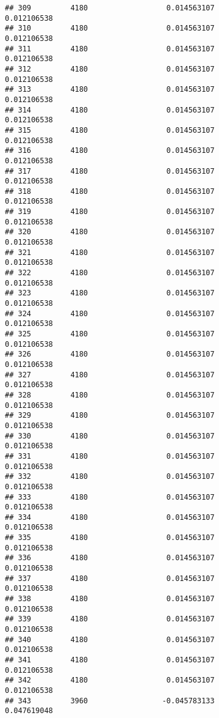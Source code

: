 \documentclass[]{article}
\begin{document}
\begin{verbatim}
## 309         4180                  0.014563107                0.012106538
## 310         4180                  0.014563107                0.012106538
## 311         4180                  0.014563107                0.012106538
## 312         4180                  0.014563107                0.012106538
## 313         4180                  0.014563107                0.012106538
## 314         4180                  0.014563107                0.012106538
## 315         4180                  0.014563107                0.012106538
## 316         4180                  0.014563107                0.012106538
## 317         4180                  0.014563107                0.012106538
## 318         4180                  0.014563107                0.012106538
## 319         4180                  0.014563107                0.012106538
## 320         4180                  0.014563107                0.012106538
## 321         4180                  0.014563107                0.012106538
## 322         4180                  0.014563107                0.012106538
## 323         4180                  0.014563107                0.012106538
## 324         4180                  0.014563107                0.012106538
## 325         4180                  0.014563107                0.012106538
## 326         4180                  0.014563107                0.012106538
## 327         4180                  0.014563107                0.012106538
## 328         4180                  0.014563107                0.012106538
## 329         4180                  0.014563107                0.012106538
## 330         4180                  0.014563107                0.012106538
## 331         4180                  0.014563107                0.012106538
## 332         4180                  0.014563107                0.012106538
## 333         4180                  0.014563107                0.012106538
## 334         4180                  0.014563107                0.012106538
## 335         4180                  0.014563107                0.012106538
## 336         4180                  0.014563107                0.012106538
## 337         4180                  0.014563107                0.012106538
## 338         4180                  0.014563107                0.012106538
## 339         4180                  0.014563107                0.012106538
## 340         4180                  0.014563107                0.012106538
## 341         4180                  0.014563107                0.012106538
## 342         4180                  0.014563107                0.012106538
## 343         3960                 -0.045783133                0.047619048

\end{verbatim}
\end{document}
